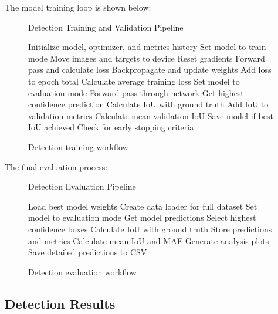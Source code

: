 \documentclass[conference]{IEEEtran}
\begin{document}
The model training loop is shown below:

\begin{figure}[H]
\begin{algorithm}[H]
\caption{Detection Training and Validation Pipeline}
\begin{algorithmic}[1]
\STATE Initialize model, optimizer, and metrics history
    \STATE Set model to train mode
        \STATE Move images and targets to device
        \STATE Reset gradients
        \STATE Forward pass and calculate loss
        \STATE Backpropagate and update weights
        \STATE Add loss to epoch total
    \ENDFOR
    \STATE Calculate average training loss
    \STATE Set model to evaluation mode
        \STATE Forward pass through network
        \STATE Get highest confidence prediction
        \STATE Calculate IoU with ground truth
        \STATE Add IoU to validation metrics
    \ENDFOR
    \STATE Calculate mean validation IoU
    \STATE Save model if best IoU achieved
    \STATE Check for early stopping criteria
\ENDFOR
\end{algorithmic}
\end{algorithm}
\caption{Detection training workflow}
\end{figure}

The final evaluation process:

\begin{figure}[H]
\begin{algorithm}[H]
\caption{Detection Evaluation Pipeline}
\begin{algorithmic}[1]
\STATE Load best model weights
    \STATE Create data loader for full dataset
    \STATE Set model to evaluation mode
        \STATE Get model predictions
        \STATE Select highest confidence boxes
        \STATE Calculate IoU with ground truth
        \STATE Store predictions and metrics
    \ENDFOR
    \STATE Calculate mean IoU and MAE
    \STATE Generate analysis plots
    \STATE Save detailed predictions to CSV
\ENDFOR
\end{algorithmic}
\end{algorithm}
\caption{Detection evaluation workflow}
\end{figure}

\subsection{Detection Results}
\end{document}
